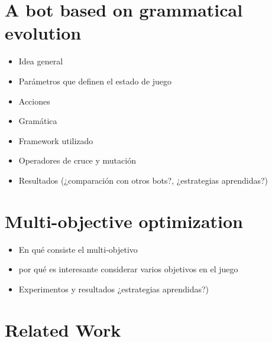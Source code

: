 \documentclass{llncs}
\begin{document}
%
\section{A bot based on grammatical evolution}
\label{sec:sec1}
%

\begin{itemize}
\item Idea general
\item Parámetros que definen el estado de juego
\item Acciones
\item Gramática
\item Framework utilizado
\item Operadores de cruce y mutación
\item Resultados (¿comparación con otros bots?, ¿estrategias aprendidas?)
\end{itemize}


%
\section{Multi-objective optimization}
\label{sec:sec3}
%

\begin{itemize}
\item En qué consiste el multi-objetivo
\item por qué es interesante considerar varios objetivos en el juego
\item Experimentos y resultados  ¿estrategias aprendidas?)
\end{itemize}

%
\section{Related Work}
\label{sec:relatedWork}
%
\end{document}
